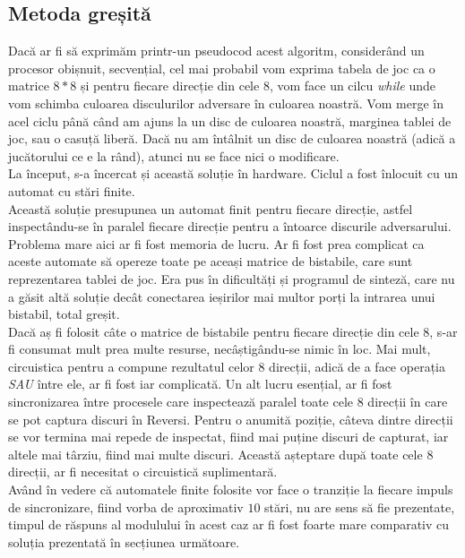\documentclass[12pt,twoside,a4paper,fleqn]{book}
\theoremstyle{definition}
\begin{document}
\subsection{Metoda greșită}
Dacă ar fi să exprimăm printr-un pseudocod acest algoritm, considerând un procesor obișnuit, secvențial, cel mai probabil vom exprima tabela de joc ca o matrice $8*8$ și pentru fiecare direcție din cele $8$, vom face un cilcu \emph{while} unde vom schimba culoarea disculurilor adversare în culoarea noastră. Vom merge în acel ciclu până când am ajuns la un disc de culoarea noastră, marginea tablei de joc, sau o casuță liberă. Dacă nu am întâlnit un disc de culoarea noastră (adică a jucătorului ce e la rând), atunci nu se face nici o modificare.\\
La început, s-a încercat și această soluție în hardware. Ciclul a fost înlocuit cu un automat cu stări finite.\\
Această soluție presupunea un automat finit pentru fiecare direcție, astfel inspectându-se în paralel fiecare direcție pentru a întoarce discurile adversarului. Problema mare aici ar fi fost memoria de lucru. Ar fi fost prea complicat ca aceste automate să opereze toate pe aceași matrice de bistabile, care sunt reprezentarea tablei de joc. Era pus în dificultăți și programul de sinteză, care nu a găsit altă soluție decât conectarea ieșirilor mai multor porți la intrarea unui bistabil, total greșit.\\
Dacă aș fi folosit câte o matrice de bistabile pentru fiecare direcție din cele $8$, s-ar fi consumat mult prea multe resurse, necâștigându-se nimic în loc. Mai mult, circuistica pentru a compune rezultatul celor $8$ direcții, adică de a face operația \emph{SAU} între ele, ar fi fost iar complicată. Un alt lucru esențial, ar fi fost sincronizarea între procesele care inspectează paralel toate cele $8$ direcții în care se pot captura discuri în Reversi. Pentru o anumită poziție, câteva dintre direcții se vor termina mai repede de inspectat, fiind mai puține discuri de capturat, iar altele mai târziu, fiind mai multe discuri. Această așteptare după toate cele $8$ direcții, ar fi necesitat o circuistică suplimentară.\\
Având în vedere că automatele finite folosite vor face o tranziție la fiecare impuls de sincronizare, fiind vorba de aproximativ $10$ stări, nu are sens să fie prezentate, timpul de răspuns al modulului în acest caz ar fi fost foarte mare comparativ cu soluția prezentată în secțiunea următoare. 
\end{document}
